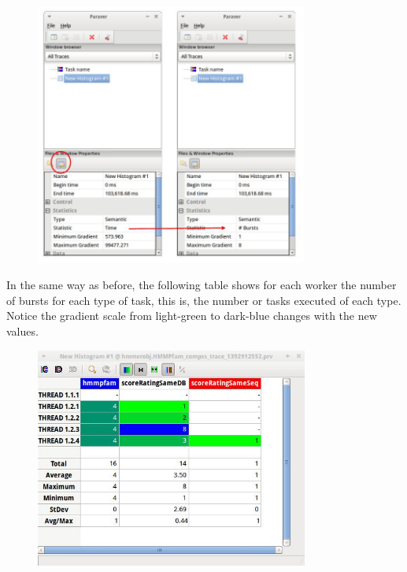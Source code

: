 \begin{figure}[ht!]
  \centering
    \includegraphics[width=0.8\textwidth]{./Sections/7_Tracing/Figures/14.jpeg}
\end{figure}

In the same way as before, the following table shows for each worker the number of bursts for each type of task, this is, the number or tasks executed of each type. Notice the gradient scale from light-green to dark-blue changes with the new values.

\begin{figure}[ht!]
  \centering
    \includegraphics[width=0.8\textwidth]{./Sections/7_Tracing/Figures/15.jpeg}
\end{figure}


